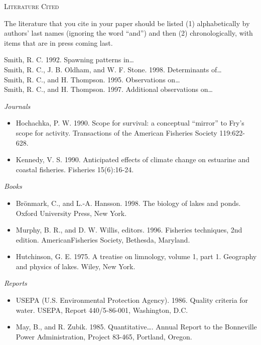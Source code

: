 \documentclass[12pt]{article}
\begin{document}
\begin{enumerate}
	\textsc{Literature Cited}
		
	The literature that you cite in your paper should be listed (1) alphabetically by authors’ last names (ignoring the word “and”) and then (2) chronologically, with items that are in press coming last.
	
	Smith, R. C. 1992. Spawning patterns in\dots \\
	Smith, R. C., J. B. Oldham, and W. F. Stone. 1998. Determinants of\dots \\
	Smith, R. C., and H. Thompson. 1995. Observations on\dots \\
	Smith, R. C., and H. Thompson. 1997. Additional observations on\dots
	
	\medskip
	\emph{Journals}
	\begin{itemize}[label={}, leftmargin=1.5em, itemindent=-1.5em]
		\item Hochachka, P. W. 1990. Scope for survival: a conceptual “mirror” to Fry’s scope for activity. Transactions of the American Fisheries Society 119:622-628.	
		\item Kennedy, V. S. 1990. Anticipated effects of climate change on estuarine and coastal fisheries. Fisheries 15(6):16-24.
	\end{itemize}
	
	\emph{Books}
	\begin{itemize}[label={}, leftmargin=1.5em, itemindent=-1.5em]
		\item Brönmark, C., and L.-A. Hansson. 1998. The biology of lakes and ponds. Oxford University Press, New York.
		\item Murphy, B. R., and D. W. Willis, editors. 1996. Fisheries techniques, 2nd edition. AmericanFisheries Society, Bethesda, Maryland.
		\item Hutchinson, G. E. 1975. A treatise on limnology, volume 1, part 1. Geography and physics of lakes. Wiley, New York.
	\end{itemize}	
	
	\emph{Reports}
	\begin{itemize}[label={}, leftmargin=1.5em, itemindent=-1.5em]
		\item USEPA (U.S. Environmental Protection Agency). 1986. Quality criteria for water. USEPA, Report 440/5-86-001, Washington, D.C.
		\item May, B., and R. Zubik. 1985. Quantitative\dots. Annual Report to the Bonneville Power Administration, Project 83-465, Portland, Oregon.
	\end{itemize}
	

\end{enumerate}
\end{document}
